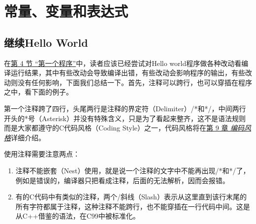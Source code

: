 

\chapter{常量、变量和表达式}
%





\section{继续Hello World}
%
在\hyperlink{db.intro.helloworld}{第 4 节 “第一个程序”}中，读者应该已经尝试对Hello world程序做各种改动看编译运行结果，其中有些改动会导致编译出错，有些改动会影响程序的输出，有些改动则没有任何影响，下面我们总结一下。首先，注释可以跨行，也可以穿插在程序之中，看下面的例子。





第一个注释跨了四行，头尾两行是注释的界定符（Delimiter）/*和*/，中间两行开头的*号（Asterisk）并没有特殊含义，只是为了看起来整齐，这不是语法规则而是大家都遵守的C代码风格（Coding Style）之一，代码风格将在\hyperlink{db.ch09.id2737598}{第 9 章 \emph{编码风格}}详细介绍。



使用注释需要注意两点：


\begin{enumerate}

\item 注释不能嵌套（Nest）使用，就是说一个注释的文字中不能再出现/*和*/了，例如是错误的，编译器只把看成注释，后面的无法解析，因而会报错。

\item 有的C代码中有类似的注释，两个/斜线（Slash）表示从这里直到该行末尾的所有字符都属于注释，这种注释不能跨行，也不能穿插在一行代码中间。这是从C+\BookSplit{}+\BookSplit{}借鉴的语法，在C99中被标准化。
\end{enumerate}

